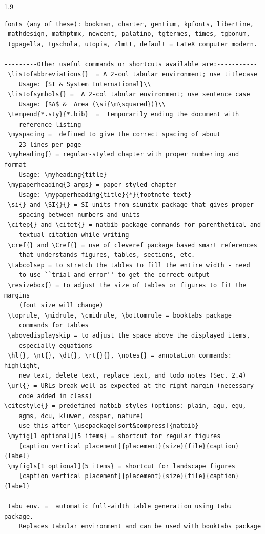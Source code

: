 \documentclass[phd]{ndsu-thesis-2022}
\newcommand\myspacing{1.9} %
\begin{document}
\begin{spacing}{\myspacing}
\begin{lstlisting}[basicstyle=\ttfamily\footnotesize\color{blue}]
 fonts (any of these): bookman, charter, gentium, kpfonts, libertine, 
 mathdesign, mathptmx, newcent, palatino, tgtermes, times, tgbonum, 
 tgpagella, tgschola, utopia, zlmtt, default = LaTeX computer modern. 
---------------------------------------------------------------------
---------Other useful commands or shortcuts available are:-----------
 \listofabbreviations{}  = A 2-col tabular environment; use titlecase 
 	Usage: {SI & System International}\\
 \listofsymbols{} =  A 2-col tabular environment; use sentence case
 	Usage: {$A$ &  Area (\si{\m\squared})}\\
 \tempend{*.sty}{*.bib}  =  temporarily ending the document with 
 	reference listing
 \myspacing =  defined to give the correct spacing of about 
 	23 lines per page
 \myheading{} = regular-styled chapter with proper numbering and format
 	Usage: \myheading{title}
 \mypaperheading{3 args} = paper-styled chapter 
 	Usage: \mypaperheading{title}{*}{footnote text}
 \si{} and \SI{}{} = SI units from siunitx package that gives proper 
 	spacing between numbers and units
 \citep{} and \citet{} = natbib package commands for parenthetical and 
 	textual citation while writing 
 \cref{} and \Cref{} = use of cleveref package based smart references 
 	that understands figures, tables, sections, etc. 
 \tabcolsep = to stretch the tables to fill the entire width - need
 	to use ``trial and error'' to get the correct output
 \resizebox{} = to adjust the size of tables or figures to fit the margins 
 	(font size will change)
 \toprule, \midrule, \cmidrule, \bottomrule = booktabs package 
 	commands for tables
 \abovedisplayskip = to adjust the space above the displayed items, 
 	especially equations 
 \hl{}, \nt{}, \dt{}, \rt{}{}, \notes{} = annotation commands: highlight, 
 	new text, delete text, replace text, and todo notes (Sec. 2.4)
 \url{} = URLs break well as expected at the right margin (necessary 
 	code added in class)	
\citestyle{} = predefined natbib styles (options: plain, agu, egu, 
	agms, dcu, kluwer, cospar, nature) 
	use this after \usepackage[sort&compress]{natbib}
 \myfig[1 optional]{5 items} = shortcut for regular figures 
 	[caption vertical placement]{placement}{size}{file}{caption}{label}
 \myfigls[1 optional]{5 items} = shortcut for landscape figures 
 	[caption vertical placement]{placement}{size}{file}{caption}{label}	
---------------------------------------------------------------------
 tabu env. =  automatic full-width table generation using tabu package. 
 	Replaces tabular environment and can be used with booktabs package

\end{lstlisting}
\end{spacing}
\end{document}
